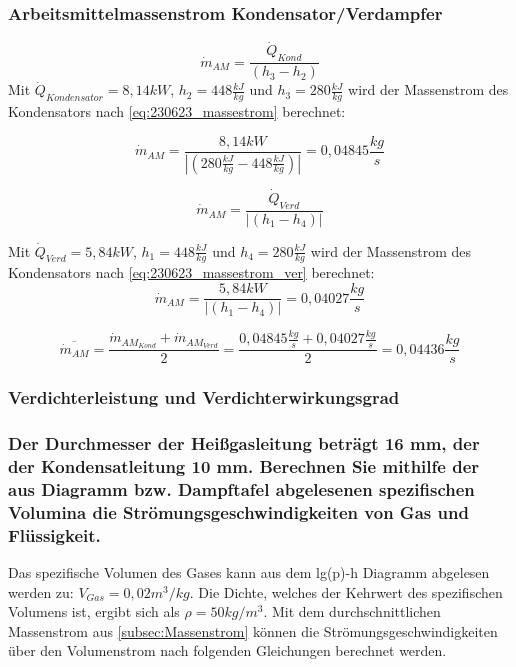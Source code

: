 \subsubsection{} 
\label{subsec:Massenstrom}
\subsubsection*{Arbeitsmittelmassenstrom Kondensator/Verdampfer}
\begin{equation}
   \dot m_{AM} = \frac{\dot Q_{Kond}}{(h_3 - h_2)}
   \label{eq:230623_massestrom}
\end{equation}
Mit $\dot Q_{Kondensator}=8,14kW$, $h_2=448\frac{kJ}{kg}$ und $h_3=280\frac{kJ}{kg}$ wird der Massenstrom des Kondensators nach \autoref*{eq:230623_massestrom} berechnet:

$$ \dot m_{AM} = \frac{8,14kW}{|(280\frac{kJ}{kg} - 448\frac{kJ}{kg})|} = 0,04845 \frac{kg}{s} $$

\begin{equation}
  \dot m_{AM} = \frac{\dot Q_{Verd}}{|(h_1-h_4)|}
    \label{eq230623_massestrom_ver}
\end{equation}

Mit $\dot Q_{Verd}=5,84kW$, $h_1=448\frac{kJ}{kg}$ und $h_4=280\frac{kJ}{kg}$ wird der Massenstrom des Kondensators nach \autoref*{eq:230623_massestrom_ver} berechnet:
$$\dot m_{AM} = \frac{5,84 kW}{|(h_1-h_4)|} = 0,04027 \frac{kg}{s}$$

$$\overline{\dot m_{AM}} = \frac{\dot m_{AM_{Kond}}+\dot m_{AM_{Verd}}}{2} = \frac{0,04845 \frac{kg}{s}+0,04027 \frac{kg}{s}}{2} = 0,04436 \frac{kg}{s} $$



\subsubsection{Verdichterleistung und Verdichterwirkungsgrad}

\subsubsection{Der Durchmesser der Heißgasleitung beträgt 16 mm, der der Kondensatleitung 10
mm. Berechnen Sie mithilfe der aus Diagramm bzw. Dampftafel abgelesenen spezifischen Volumina die Strömungsgeschwindigkeiten von Gas und Flüssigkeit.}

Das spezifische Volumen des Gases kann aus dem lg(p)-h Diagramm abgelesen werden zu: $V_{Gas}=0,02 m^3/kg$. Die Dichte, welches der Kehrwert des spezifischen Volumens ist, ergibt sich als $\rho=50 kg/m^3$. 
Mit dem durchschnittlichen Massenstrom aus \autoref{subsec:Massenstrom} können die Strömungsgeschwindigkeiten über den Volumenstrom nach folgenden Gleichungen berechnet werden.

